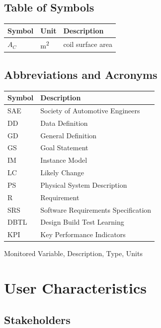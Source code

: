 \documentclass[12pt]{article}
\begin{document}
\subsection{Table of Symbols}

\renewcommand{\arraystretch}{1.2}
\noindent \begin{longtable*}{l l p{12cm}} \toprule
\textbf{Symbol} & \textbf{Unit} & \textbf{Description}\\
\midrule 
$A_C$ & \si[per-mode=symbol] {\square\metre} & coil surface area\\
\bottomrule
\end{longtable*}


\subsection{Abbreviations and Acronyms}

\renewcommand{\arraystretch}{1.2}
\noindent \begin{longtable*}{l p{13cm}} 
  \toprule		
  \textbf{Symbol} & \textbf{Description}\\
  \midrule 
  SAE & Society of Automotive Engineers\\
  DD & Data Definition\\
  GD & General Definition\\
  GS & Goal Statement\\
  IM & Instance Model\\
  LC & Likely Change\\
  PS & Physical System Description\\
  R & Requirement\\
  SRS & Software Requirements Specification\\
  DBTL & Design Build Test Learning\\
  KPI & Key Performance Indicators\\
  \bottomrule
\end{longtable*}


Monitored Variable, Description, Type, Units
\section{User Characteristics}


\subsection{Stakeholders}
\end{document}
